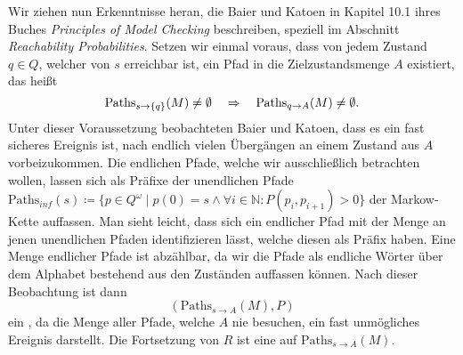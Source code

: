 \documentclass[a4paper]{article}
\newcommand{\mc}{Markow-Kette}
\theoremstyle{nonumberplain}
\begin{document}
Wir ziehen nun Erkenntnisse heran, die Baier und Katoen in Kapitel 10.1 ihres Buches \textit{Principles of Model Checking} \cite{Bai08} beschreiben, speziell im Abschnitt \textit{Reachability Probabilities}.
Setzen wir einmal voraus, dass von jedem Zustand $q\in Q$, welcher von $s$ erreichbar ist, ein Pfad in die Zielzustandsmenge $A$ existiert, das heißt
\[
\mathrm{Paths}_{s \rightarrow \{q\}}(M) \neq \emptyset  \quad \Rightarrow \quad \mathrm{Paths}_{q \rightarrow A}(M) \neq \emptyset \text{.}
\]
 Unter dieser Voraussetzung beobachteten Baier und Katoen, dass es ein fast sicheres Ereignis ist, nach endlich vielen Übergängen an einem Zustand aus $A$ vorbeizukommen.
Die endlichen Pfade, welche wir ausschließlich betrachten wollen, lassen sich als Präfixe der unendlichen Pfade $\mathrm{Paths}_{inf}(s) \coloneqq \{p \in Q^\omega \mid p(0) = s \land \forall i \in \mathbb{N}: P(p_i,p_{i+1})>0 \}$ der \mc{} auffassen.
Man sieht leicht, dass sich ein endlicher Pfad mit der Menge an jenen unendlichen Pfaden identifizieren lässt, welche diesen als  Präfix haben.
Eine Menge endlicher Pfade ist abzählbar, da wir die Pfade als endliche Wörter über dem Alphabet bestehend aus den Zuständen auffassen können.
Nach dieser Beobachtung ist dann
\[
(\mathrm{Paths}_{s \rightarrow A}(M), P)
\] ein \probspace{}, da die Menge aller Pfade, welche $A$ nie besuchen, ein fast unmögliches Ereignis darstellt. Die Fortsetzung von $R$ ist eine \rvar{} auf $\mathrm{Paths}_{s \rightarrow A}(M)$. 
\end{document}
